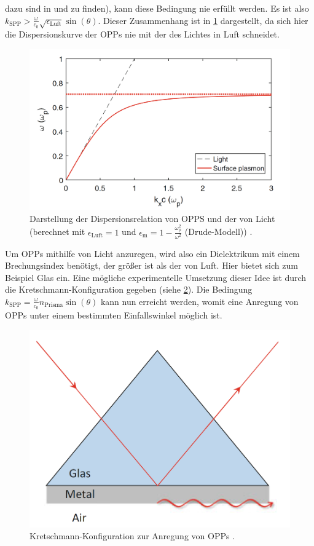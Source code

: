 dazu sind in \cite{linden_photonics} und \cite{nano} zu finden), kann diese Bedingung nie erfüllt werden. Es ist also $k_{\mathrm{SPP}} > \frac{\omega}{c_0}\sqrt{\epsilon_{\mathrm{Luft}}}\sin(\theta)$.
Dieser Zusammenhang ist in \cref{fig:dispersion} dargestellt, da sich hier die Dispersionskurve der OPPs nie mit der des Lichtes in Luft schneidet.
\begin{figure}[H]
	\centering
	\includegraphics[width=0.6\linewidth]{../figs/dispersion.png}
	\caption{Darstellung der Dispersionsrelation von OPPS und der von Licht (berechnet mit $\epsilon_{\mathrm{Luft}} = 1$ und $\epsilon_{\mathrm{m}} = 1 - \frac{\omega_{\mathrm{p}}^2}{\omega^2}$ (Drude-Modell)) \cite{nano}.}
	\label{fig:dispersion}
\end{figure} Um OPPs mithilfe von Licht anzuregen, wird also ein Dielektrikum mit einem Brechungsindex benötigt, der größer ist als der von Luft. Hier bietet sich zum Beispiel Glas ein.
Eine mögliche experimentelle Umsetzung dieser Idee ist durch die Kretschmann-Konfiguration gegeben (siehe \cref{fig:kretschmann}). Die Bedingung $k_{\mathrm{SPP}} = \frac{\omega}{c_0}n_{\mathrm{Prisma}}\sin(\theta)$
kann nun erreicht werden, womit eine Anregung von OPPs unter einem bestimmten Einfallswinkel möglich ist.
\begin{figure}[H]
	\centering
	\includegraphics[width=0.4\linewidth]{../figs/kretschmann.png}
	\caption{Kretschmann-Konfiguration zur Anregung von OPPs \cite{nano}.}
	\label{fig:kretschmann}
\end{figure}